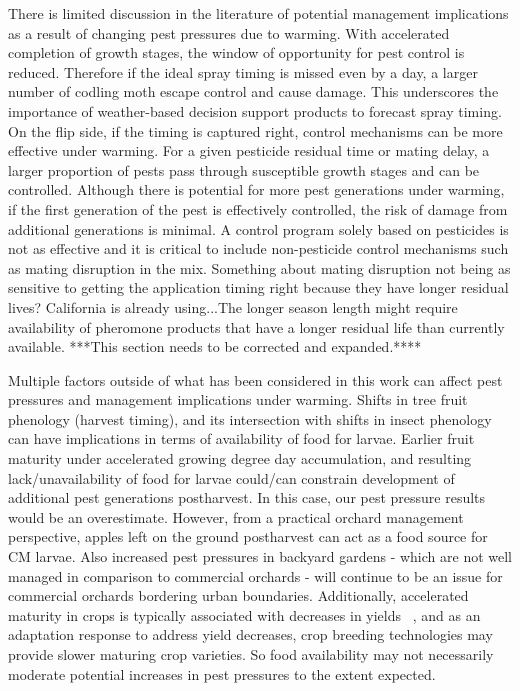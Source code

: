 \documentclass[12pt]{article}
\theoremstyle{plain}
\theoremstyle{definition}
\theoremstyle{definition}
\begin{document}
There is limited discussion in the literature of 
potential management implications as a result 
of changing pest pressures due to warming. With 
accelerated completion of growth stages, the window 
of opportunity for pest control is reduced. Therefore 
if the ideal spray timing is missed even by a day, 
a larger number of codling moth escape control 
and cause damage. This underscores the importance 
of weather-based decision support products to 
forecast spray timing. On the flip side, if the timing 
is captured right, control mechanisms can be more 
effective under warming. For a given pesticide 
residual time or mating delay, a larger proportion 
of pests pass through susceptible growth stages 
and can be controlled. Although there is potential 
for more pest generations under warming, if the 
first generation of the pest is effectively controlled, 
the risk of damage from additional generations is 
minimal. A control program solely based on pesticides 
is not as effective and it is critical to include non-pesticide 
control mechanisms such as mating disruption in the 
mix. Something about mating disruption not being 
as sensitive to getting the application timing right 
because they have longer residual lives?  
California is already using...The longer season 
length might require availability of pheromone 
products that have a longer residual life than 
currently available. ***This section needs to be corrected and expanded.****

Multiple factors outside of what has been 
considered in this work can affect pest 
pressures and management implications 
under warming. Shifts in tree fruit phenology 
(harvest timing), and its intersection with shifts 
in insect phenology can have implications in 
terms of availability of food for larvae. Earlier 
fruit maturity under accelerated growing degree 
day accumulation, and resulting lack/unavailability
 of food for larvae could/can constrain development of 
 additional pest generations postharvest. In this case, 
 our pest pressure results would be an overestimate. 
 However, from a practical orchard management 
 perspective, apples left on the ground 
 postharvest can act as a food source for 
 CM larvae. Also increased pest pressures 
 in backyard gardens - which are not well 
 managed in comparison to commercial orchards 
 - will continue to be an issue for commercial 
 orchards bordering urban boundaries. 
 Additionally, accelerated maturity in crops is 
 typically associated with decreases in yields~\cite{Rajagopalan_Chin}
, and as an 
 adaptation response to address yield decreases, 
 crop breeding technologies may provide slower 
 maturing crop varieties. So food availability 
 may not necessarily moderate potential 
 increases in pest pressures to the extent expected.
 
\end{document}

